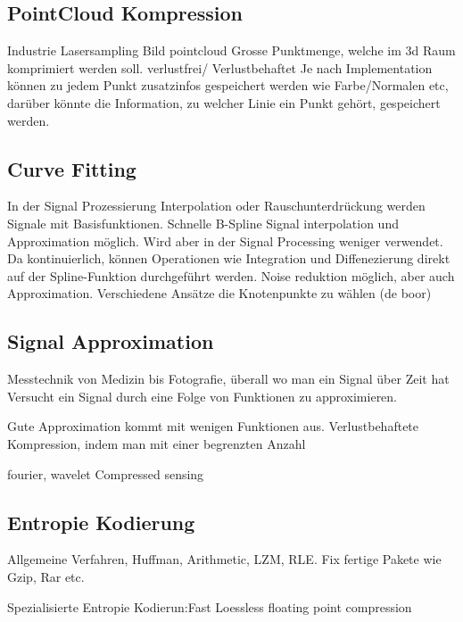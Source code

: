 \subsection{PointCloud Kompression}
Industrie Lasersampling
Bild pointcloud \cite{merry2006compression:pointcloud}
Grosse Punktmenge, welche im 3d Raum komprimiert werden soll.
verlustfrei/ Verlustbehaftet
Je nach Implementation können zu jedem Punkt zusatzinfos gespeichert werden wie Farbe/Normalen etc, darüber könnte die Information, zu welcher Linie ein Punkt gehört, gespeichert werden.

\subsection{Curve Fitting}
In der Signal Prozessierung Interpolation oder Rauschunterdrückung werden Signale mit Basisfunktionen.  \cite{unser1993b:spline} Schnelle B-Spline Signal interpolation und Approximation möglich. Wird aber in der Signal Processing weniger verwendet. Da kontinuierlich, können Operationen wie Integration und Diffenezierung direkt auf der Spline-Funktion durchgeführt werden. Noise reduktion möglich, aber auch Approximation. Verschiedene Ansätze die Knotenpunkte zu wählen (de boor)

\subsection{Signal Approximation}
Messtechnik von Medizin bis Fotografie, überall wo man ein Signal über Zeit hat
Versucht ein Signal durch eine Folge von Funktionen zu approximieren.

Gute Approximation kommt mit wenigen Funktionen aus.
Verlustbehaftete Kompression, indem man mit einer begrenzten Anzahl

fourier, wavelet Compressed sensing

\subsection{Entropie Kodierung}
Allgemeine Verfahren, Huffman, Arithmetic, LZM, RLE.
Fix fertige Pakete wie Gzip, Rar etc.

Spezialisierte Entropie Kodierun:Fast Loessless floating point compression \cite{ratanaworabhan2006fast}